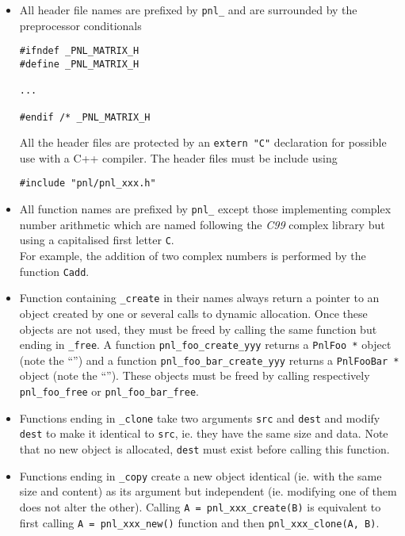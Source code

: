 \documentclass[a4paper,11pt,twoside]{article}
\newcommand{\ptr}{\textasteriskcentered}
\begin{document}
\begin{itemize}
  \item All header file names are prefixed by \verb!pnl_! and are surrounded by
    the preprocessor conditionals
\begin{verbatim}
#ifndef _PNL_MATRIX_H
#define _PNL_MATRIX_H

...

#endif /* _PNL_MATRIX_H
\end{verbatim}
All the header files are protected by an \verb!extern "C"! declaration for
possible use with a C++ compiler. The header files must be include using
\begin{verbatim}
#include "pnl/pnl_xxx.h"
\end{verbatim}

  \item All function names are prefixed by \verb!pnl_! except those implementing
    complex number arithmetic which are named following the \textit{C99}
    complex library but using a capitalised first letter \verb!C!. \\
    For example, the addition of two complex numbers is performed by the
    function \verb!Cadd!.

  \item Function containing \verb!_create! in their names always return a
    pointer to an object created by one or several calls to dynamic
    allocation. Once these objects are not used, they must be freed by calling
    the same function but ending in \verb!_free!.
    A function \verb!pnl_foo_create_yyy! returns a \verb!PnlFoo *! object (note
    the ``\ptr'') and a function \verb!pnl_foo_bar_create_yyy! returns a
    \verb!PnlFooBar *! object (note the ``\ptr'').
    These objects must be freed by calling respectively \verb!pnl_foo_free! or
    \verb!pnl_foo_bar_free!.

  \item Functions ending in \verb!_clone! take two arguments \verb!src! and
    \verb!dest! and modify \verb!dest! to make it identical to \verb!src!, ie.
    they have the same size and data. Note that no new object is allocated,
    \verb!dest! must exist before calling this function.

  \item Functions ending in \verb!_copy! create a new object identical (ie. with
    the same size and content) as its argument but independent (ie. modifying
    one of them does not alter the other). Calling \verb!A = pnl_xxx_create(B)!
    is equivalent to first calling \verb!A = pnl_xxx_new()! function and then
    \verb!pnl_xxx_clone(A, B)!.
    

\end{itemize}
\end{document}
